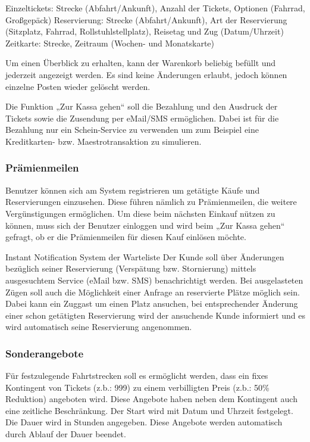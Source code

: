 Einzeltickets: Strecke (Abfahrt/Ankunft), Anzahl der Tickets, Optionen (Fahrrad, Großgepäck)
Reservierung: Strecke (Abfahrt/Ankunft), Art der Reservierung (Sitzplatz, Fahrrad, Rollstuhlstellplatz), Reisetag und Zug (Datum/Uhrzeit)
Zeitkarte: Strecke, Zeitraum (Wochen- und Monatskarte)

Um einen Überblick zu erhalten, kann der Warenkorb beliebig befüllt und jederzeit angezeigt werden. Es sind keine Änderungen erlaubt, jedoch können einzelne Posten wieder gelöscht werden.

Die Funktion „Zur Kassa gehen“ soll die Bezahlung und den Ausdruck der Tickets sowie die Zusendung per eMail/SMS ermöglichen. Dabei ist für die Bezahlung nur ein Schein-Service zu verwenden um zum Beispiel eine Kreditkarten- bzw. Maestrotransaktion zu simulieren.

\subsubsection{Prämienmeilen}

Benutzer können sich am System registrieren um getätigte Käufe und Reservierungen einzusehen. Diese führen nämlich zu Prämienmeilen, die weitere Vergünstigungen ermöglichen. Um diese beim nächsten Einkauf nützen zu können, muss sich der Benutzer einloggen und wird beim „Zur Kassa gehen“ gefragt, ob er die Prämienmeilen für diesen Kauf einlösen möchte.

Instant Notification System der Warteliste
Der Kunde soll über Änderungen bezüglich seiner Reservierung (Verspätung bzw. Stornierung) mittels ausgesuchtem Service (eMail bzw. SMS) benachrichtigt werden. Bei ausgelasteten Zügen soll auch die Möglichkeit einer Anfrage an reservierte Plätze möglich sein. Dabei kann ein Zuggast um einen Platz ansuchen, bei entsprechender Änderung einer schon getätigten Reservierung wird der ansuchende Kunde informiert und es wird automatisch seine Reservierung angenommen.

\subsubsection{Sonderangebote}

Für festzulegende Fahrtstrecken soll es ermöglicht werden, dass ein fixes Kontingent von Tickets (z.b.: 999) zu einem verbilligten Preis (z.b.: 50\% Reduktion) angeboten wird. Diese Angebote haben neben dem Kontingent auch eine zeitliche Beschränkung. Der Start wird mit Datum und Uhrzeit festgelegt. Die Dauer wird in Stunden angegeben. Diese Angebote werden automatisch durch Ablauf der Dauer beendet.\\

